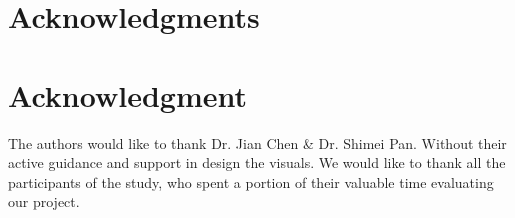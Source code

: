 \documentclass[10pt,journal,compsoc]{IEEEtran}
\begin{document}
%
\ifCLASSOPTIONcompsoc
  \section*{Acknowledgments}
\else
  \section*{Acknowledgment}
\fi

The authors would like to thank Dr. Jian Chen \& Dr. Shimei Pan. Without their active guidance and support in design the visuals. We would like to thank all the participants of the study, who spent a portion of their valuable time evaluating our project.

\ifCLASSOPTIONcaptionsoff
  \newpage
\fi





%
%
%
\end{document}
